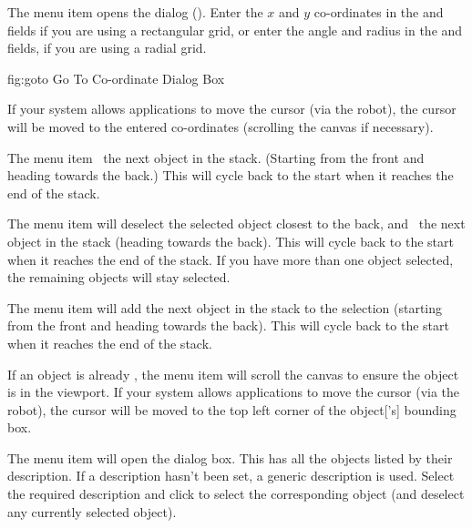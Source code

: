 
The  menu item opens the
 dialog ().  Enter the
$x$ and $y$ co-ordinates in the  and
 fields if you are using a rectangular grid,
or enter the angle and radius in the  and
 fields, if you are using a radial grid.

\FloatFig
  {fig:goto}
  {}
  {Go To Co-ordinate Dialog Box}

If your system allows applications to move the cursor
(via the \gls{robot}), the cursor will be moved to the entered
co-ordinates (scrolling the \gls{canvas} if necessary).


The  menu item 
\selects\ the next \gls{object} in the \gls{stack}. (Starting from the
\gls{front} and heading towards the \gls{back}.) This will cycle back to
the start when it reaches the end of the \gls{stack}.


The  menu item will deselect the
selected \gls{object} closest to the \gls{back}, and \select\
the next \gls{object} in the \gls{stack} (heading towards the \gls{back}). This
will cycle back to the start when it reaches the end of the stack.
If you have more than one \gls{object} selected, the remaining
\glspl*{object} will stay selected.


The  menu item will add
the next \gls{object} in the \gls{stack} to the selection (starting from
the \gls{front} and heading towards the \gls{back}). This will cycle back to
the start when it reaches the end of the stack.


If an \gls{object} is already \selected, the 
menu item will scroll the \gls{canvas} to ensure the \gls{object} is
in the viewport. If your system allows applications to move the
cursor (via the \gls{robot}), the cursor will be moved to the top left corner of the
\gls{object}['s] bounding box.


The  menu item will open the
 dialog box. This has all the \glspl{object}
listed by their description.  If a description hasn't been set, a
generic description is used.  Select the required description and
click \btn{okay} to select the corresponding \gls{object} (and
deselect any currently selected \gls{object}).

